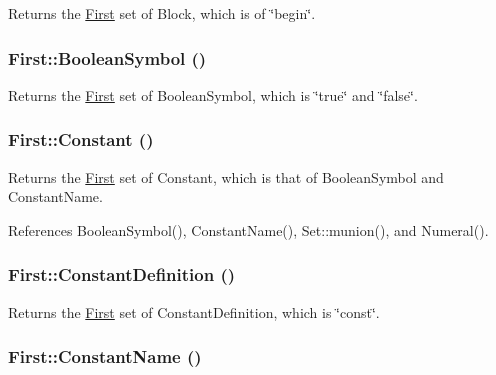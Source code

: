 Returns the \hyperlink{classFirst}{First} set of Block, which is of \char`\"{}begin\char`\"{}. 

\hypertarget{classFirst_ad54b225baf52d7c2a020615d50549af1}{
\subsubsection[{BooleanSymbol}]{ First::BooleanSymbol ()}}
\label{classFirst_ad54b225baf52d7c2a020615d50549af1}


Returns the \hyperlink{classFirst}{First} set of BooleanSymbol, which is \char`\"{}true\char`\"{} and \char`\"{}false\char`\"{}. 

\hypertarget{classFirst_a7a9a1bfc65dabe8a153af1dcacd502d3}{
\subsubsection[{Constant}]{ First::Constant ()}}
\label{classFirst_a7a9a1bfc65dabe8a153af1dcacd502d3}


Returns the \hyperlink{classFirst}{First} set of Constant, which is that of BooleanSymbol and ConstantName. 



References BooleanSymbol(), ConstantName(), Set::munion(), and Numeral().

\hypertarget{classFirst_a67220fb2ed992341a3769a7251366674}{
\subsubsection[{ConstantDefinition}]{ First::ConstantDefinition ()}}
\label{classFirst_a67220fb2ed992341a3769a7251366674}


Returns the \hyperlink{classFirst}{First} set of ConstantDefinition, which is \char`\"{}const\char`\"{}. 

\hypertarget{classFirst_a36b5dd323041edb5e4a2043776034331}{
\subsubsection[{ConstantName}]{ First::ConstantName ()}}
\label{classFirst_a36b5dd323041edb5e4a2043776034331}


